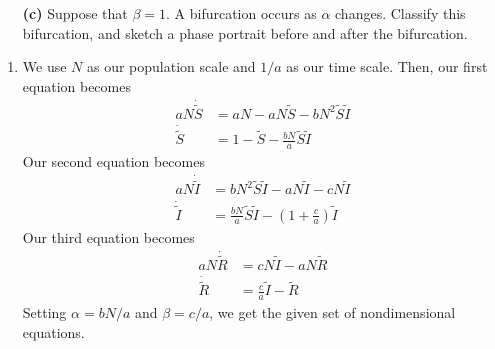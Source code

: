 \documentclass[10pt,letterpaper]{report}
\begin{document}
\begin{enumerate}
\begin{qbox}
\begin{itemize}
    \item[\textbf{(c)}] Suppose that $\beta = 1$. A bifurcation occurs as $\alpha$ changes. Classify this bifurcation, and sketch a phase portrait before and after the bifurcation.
\end{itemize}
\end{qbox}

\begin{enumerate}
    \item We use $N$ as our population scale and $1/a$ as our time scale. Then, our first equation becomes
    \begin{align*}
        aN \dot{\widetilde S} &= aN - aN\widetilde S - bN^2 \widetilde S \widetilde I \\
        \dot{\widetilde S} &= 1 - \widetilde S - \frac{bN}{a} \widetilde S \widetilde I
    \end{align*}
    Our second equation becomes 
    \begin{align*}
        a N \dot{\widetilde I} &= b N^2 \widetilde S \widetilde I - aN\widetilde I - c N \widetilde I \\
        \dot{\widetilde I} &= \frac{bN}{a}\widetilde S \widetilde I - \left(1 + \frac{c}{a}\right) \widetilde I
    \end{align*}
    Our third equation becomes
    \begin{align*}
        aN \dot{\widetilde R} &= c N \widetilde I - a N \widetilde R \\
        \dot{\widetilde R} &= \frac{c}{a}\widetilde I - \widetilde R
    \end{align*}
    Setting $\alpha = bN/a$ and $\beta = c/a$, we get the given set of nondimensional equations.
    

\end{enumerate}
\end{enumerate}
\end{document}
